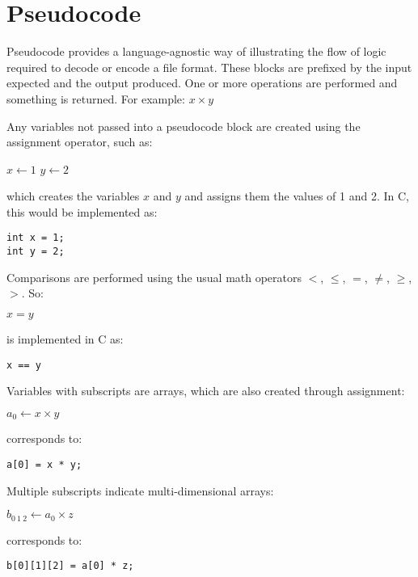 \clearpage

\section{Pseudocode}

Pseudocode provides a language-agnostic way of illustrating the flow of logic
required to decode or encode a file format.
These blocks are prefixed by the input expected and the output produced.
One or more operations are performed and something is returned.
For example:
\Return $x \times y$\;
\EALGORITHM
\par
\noindent
Any variables not passed into a pseudocode block are created
using the assignment operator, such as:
\par
\noindent
\begin{algorithm}[H]
  \DontPrintSemicolon
  $x \leftarrow 1$\;
  $y \leftarrow 2$\;
\end{algorithm}
\par
\noindent
which creates the variables $x$ and $y$ and assigns them the values of 1 and 2.
In C, this would be implemented as:
\begin{Verbatim}[xleftmargin=.25in]
int x = 1;
int y = 2;
\end{Verbatim}
Comparisons are performed using the usual math operators
$<$, $\leq$, $=$, $\neq$, $\geq$, $>$.  So:
\par
\noindent
\begin{algorithm}[H]
  \DontPrintSemicolon
  $x = y$\;
\end{algorithm}
\par
\noindent
is implemented in C as:
\begin{Verbatim}[xleftmargin=.25in]
x == y
\end{Verbatim}
Variables with subscripts are arrays,
which are also created through assignment:
\par
\noindent
\begin{algorithm}[H]
  \DontPrintSemicolon
  $a_0 \leftarrow x \times y$\;
\end{algorithm}
\par
\noindent
corresponds to:
\begin{Verbatim}[xleftmargin=.25in]
a[0] = x * y;
\end{Verbatim}
Multiple subscripts indicate multi-dimensional arrays:
\par
\noindent
\begin{algorithm}[H]
  \DontPrintSemicolon
  $b_{0~1~2} \leftarrow a_0 \times z$\;
\end{algorithm}
\par
\noindent
corresponds to:
\begin{Verbatim}[xleftmargin=.25in]
b[0][1][2] = a[0] * z;
\end{Verbatim}

